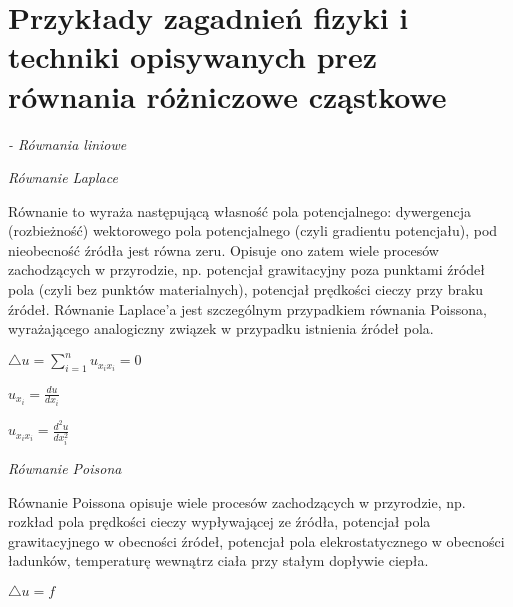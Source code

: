 \section{Przykłady zagadnień fizyki i techniki opisywanych prez równania różniczowe cząstkowe}


\textit{- Równania liniowe}


\textit{Równanie Laplace}


Równanie to wyraża następującą własność pola potencjalnego: dywergencja (rozbieżność) wektorowego pola potencjalnego (czyli gradientu potencjału), pod nieobecność źródła jest równa zeru. Opisuje ono zatem wiele procesów zachodzących w przyrodzie, np. potencjał grawitacyjny poza punktami źródeł pola (czyli bez punktów materialnych), potencjał prędkości cieczy przy braku źródeł. Równanie Laplace’a jest szczególnym przypadkiem równania Poissona, wyrażającego analogiczny związek w przypadku istnienia źródeł pola.


$ \bigtriangleup u = \sum_{i=1}^{n} u_{x_ix_i} =0$

$ u_{x_i} = \frac{du}{dx_i}$

$ u_{x_i x_i} = \frac{d^2u}{dx_i^2}$

\textit{Równanie Poisona}



Równanie Poissona opisuje wiele procesów zachodzących w przyrodzie, np. rozkład pola prędkości cieczy wypływającej ze źródła, potencjał pola grawitacyjnego w obecności źródeł, potencjał pola elekrostatycznego w obecności ładunków, temperaturę wewnątrz ciała przy stałym dopływie ciepła.

$ \bigtriangleup u =f$